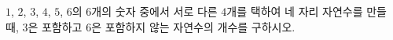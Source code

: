 \hspace*{2mm}\begin{minipage}[t]{\dimexpr\linewidth-2mm\relax}\vspace{0pt}
$1$, $2$, $3$, $4$, $5$, $6$의 $6$개의 숫자 중에서 서로 다른 $4$개를 택하여 네 자리 자연수를 만들 때, $3$은 포함하고 $6$은 포함하지 않는 자연수의 개수를 구하시오.\end{minipage}
